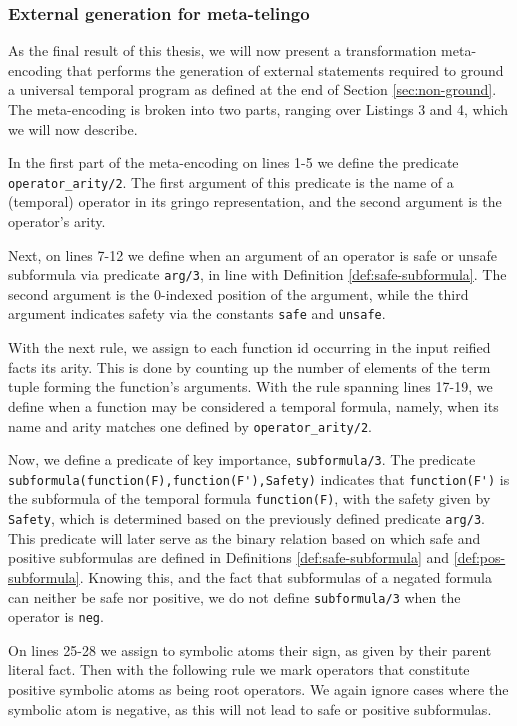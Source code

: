 \subsubsection{External generation for meta-telingo}

As the final result of this thesis, we will now present a
transformation meta-encoding that performs the generation of external
statements required to ground a universal temporal program as defined
at the end of Section \ref{sec:non-ground}. The meta-encoding is
broken into two parts, ranging over Listings 3 and 4, which we will
now describe.

In the first part of the meta-encoding on lines 1-5 we define the
predicate \verb|operator_arity/2|. The first argument of this
predicate is the name of a (temporal) operator in its gringo
representation, and the second argument is the operator's arity.

Next, on lines 7-12 we define when an argument of an operator is safe
or unsafe subformula via predicate \verb|arg/3|, in line with
Definition \ref{def:safe-subformula}. The second argument is the
0-indexed position of the argument, while the third argument indicates
safety via the constants \verb|safe| and \verb|unsafe|.

With the next rule, we assign to each function id occurring in the
input reified facts its arity. This is done by counting up the number
of elements of the term tuple forming the function's arguments. With
the rule spanning lines 17-19, we define when a function may be
considered a temporal formula, namely, when its name and arity matches one
defined by \verb|operator_arity/2|.

Now, we define a predicate of key importance, \verb|subformula/3|. The
predicate \verb|subformula(function(F),function(F'),Safety)| indicates
that \verb|function(F')| is the subformula of the temporal formula
\verb|function(F)|, with the safety given by \verb|Safety|, which is
determined based on the previously defined predicate
\verb|arg/3|. This predicate will later serve as the binary relation
based on which safe and positive subformulas are defined in
Definitions \ref{def:safe-subformula} and
\ref{def:pos-subformula}. Knowing this, and the fact that subformulas
of a negated formula can neither be safe nor positive, we do not
define \verb|subformula/3| when the operator is \verb|neg|.

On lines 25-28 we assign to symbolic atoms their sign, as given by
their parent literal fact. Then with the following rule we mark
operators that constitute positive symbolic atoms as being root
operators. We again ignore cases where the symbolic atom is negative,
as this will not lead to safe or positive subformulas.

